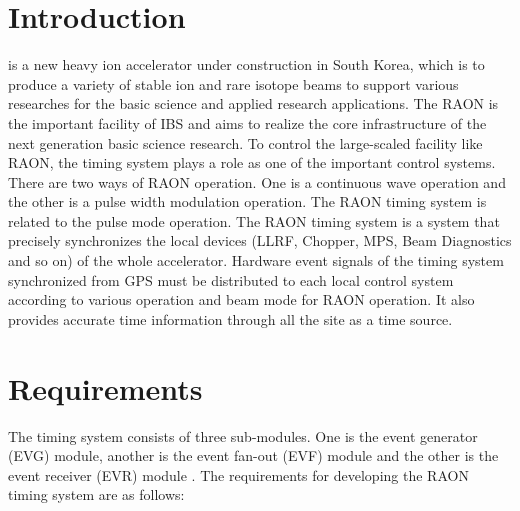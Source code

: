 \documentclass[journal,reqno]{IEEEtran}
\begin{document}
\section{Introduction}
% 
% 
% 
% 

 is a new heavy ion accelerator under construction in South Korea, which is to produce a variety of stable ion and rare isotope beams to support various researches for the basic science and applied research applications\cite{risp_overview,risp}. The RAON is the important facility of IBS and aims to realize the core infrastructure of the next generation basic science research. To control the large-scaled facility like RAON, the timing system plays a role as one of the important control systems. There are two ways of RAON operation. One is a continuous wave operation and the other is a pulse width modulation operation. The RAON timing system is related to the pulse mode operation. The RAON timing system is a system that precisely synchronizes the local devices (LLRF, Chopper, MPS, Beam Diagnostics and so on) of the whole accelerator. Hardware event signals of the timing system synchronized from GPS must be distributed to each local control system according to various operation and beam mode for RAON operation. It also provides accurate time information through all the site as a time source.

\section{Requirements}
The timing system consists of three sub-modules. One is the event generator (EVG) module, another is the event fan-out (EVF) module and the other is the event receiver (EVR) module \cite{white_rabbit,gis_timing}.
The requirements for developing the RAON timing system are as follows:
\end{document}
